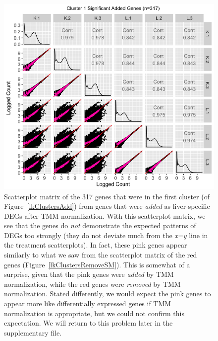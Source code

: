 \documentclass[11pt,a4paper,oldfontcommands,openany]{memoir}
\numberwithin{equation}{section} %
\begin{document}
\null
\begin{figure}[t!]
\begin{framed}
\centerline{\includegraphics[width=1\columnwidth]{MakeFigures/lkClustersAddSM.jpg}}
\end{framed}
\caption{Scatterplot matrix of the 317 genes that were in the first cluster (of Figure~\ref{lkClustersAdd}) from genes that were \textit{added} as liver-specific DEGs after TMM normalization. With this scatterplot matrix, we see that the genes do \textit{not} demonstrate the expected patterns of DEGs too strongly (they do not deviate much from the \textit{x=y} line in the treatment scatterplots). In fact, these pink genes appear similarly to what we saw from the scatterplot matrix of the red genes (Figure~\ref{lkClustersRemoveSM}). This is somewhat of a surprise, given that the pink genes were \textit{added} by TMM  normalization, while the red genes were \textit{removed} by TMM normalization. Stated differently, we would expect the pink genes to appear more like differentially expressed genes if TMM normalization is appropriate, but we could not confirm this expectation. We will return to this problem later in the supplementary file.
\label{lkClustersAddSM}}
\end{figure}
\end{document}
